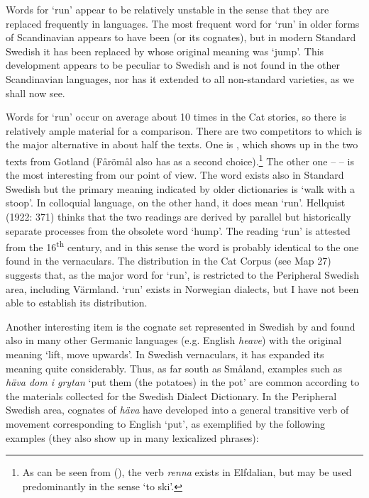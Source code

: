 Words for ‘run’ appear to be relatively unstable in the sense that they are replaced frequently in languages. The most frequent word for ‘run’ in older forms of Scandinavian appears to have been (or its cognates), but in modern Standard Swedish it has been replaced by whose original meaning was ‘jump’. This development appears to be peculiar to Swedish and is not found in the other Scandinavian languages, nor has it extended to all non-standard varieties, as we shall now see. 

Words for ‘run’ occur on average about 10 times in the Cat stories, so there is relatively ample material for a comparison. There are two competitors to which is the major alternative in about half the texts. One is , which shows up in the two texts from Gotland (Fårömål also has  as a second choice).\footnote{ As can be seen from (), the verb \textit{renna} exists in Elfdalian, but may be used predominantly in the sense ‘to ski’.} The other one –  – is the most interesting from our point of view. The word exists also in Standard Swedish but the primary meaning indicated by older dictionaries is ‘walk with a stoop’. In colloquial language, on the other hand, it does mean ‘run’. Hellquist (1922: 371) thinks that the two readings are derived by parallel but historically separate processes from the obsolete word  ‘hump’. The reading ‘run’ is attested from the 16\textsuperscript{th} century, and in this sense the word is probably identical to the one found in the vernaculars. The distribution in the Cat Corpus (see Map 27) suggests that, as the major word for ‘run’,  is restricted to the Peripheral Swedish area, including Värmland.  ‘run’ exists in Norwegian dialects, but I have not been able to establish its distribution.

Another interesting item is the cognate set represented in Swedish by  and found also in many other Germanic languages (e.g. English \textit{heave}) with the original meaning ‘lift, move upwards’. In Swedish vernaculars, it has expanded its meaning quite considerably. Thus, as far south as Småland, examples such as \textit{häva dom i grytan} ‘put them (the potatoes) in the pot’ are common according to the materials collected for the Swedish Dialect Dictionary. In the Peripheral Swedish area, cognates\textit{ }of \textit{häva} have developed into a general transitive verb of movement corresponding to English ‘put’, as exemplified by the following examples (they also show up in many lexicalized phrases):

